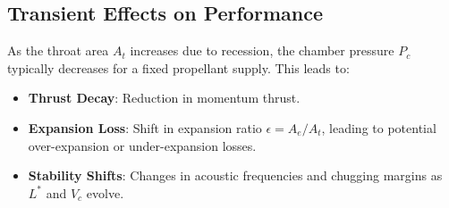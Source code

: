 \subsection{Transient Effects on Performance}
As the throat area $A_t$ increases due to recession, the chamber pressure $P_c$ typically decreases for a fixed propellant supply. This leads to:
\begin{itemize}
    \item \textbf{Thrust Decay}: Reduction in momentum thrust.
    \item \textbf{Expansion Loss}: Shift in expansion ratio $\epsilon = A_e/A_t$, leading to potential over-expansion or under-expansion losses.
    \item \textbf{Stability Shifts}: Changes in acoustic frequencies and chugging margins as $L^*$ and $V_c$ evolve.
\end{itemize}
